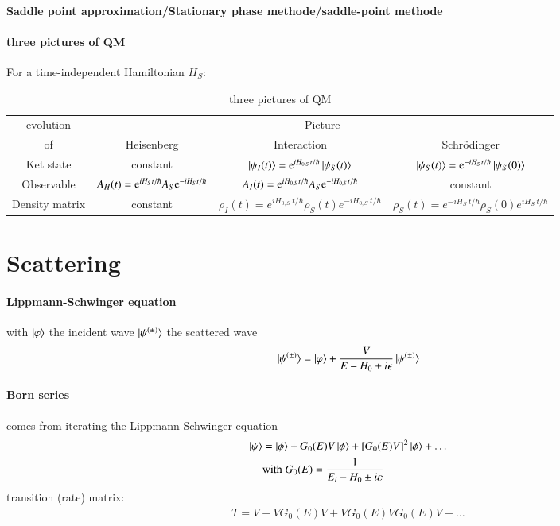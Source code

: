 \paragraph{Saddle point approximation/Stationary phase methode/saddle-point methode}
\paragraph{three pictures of QM}
For a time-independent Hamiltonian $H_S$:
\begin{table}[H]
	\centering
	\begin{tabular}{cccc}
		\toprule
		evolution & \multicolumn{3}{c}{Picture} \\
		of & Heisenberg & Interaction & Schrödinger \\
		\midrule
		Ket state & constant & $\ket{\psi_I(t)}=\mathrm{e}^{iH_{0,S}t/\hbar}\ket{\psi_S (t)}$ & $\ket{\psi_S(t)}=\mathrm{e}^{-iH_St/\hbar}\ket{\psi_S(0)}$ \\
		Observable & $A_H(t) = \mathrm{e}^{iH_S t/ \hbar}A_S \mathrm{e}^{-iH_S t / \hbar}$ & $ A_I(t) = \mathrm{e}^{iH_{0,S}t/\hbar}A_S\mathrm{e}^{-iH_{0,S}t/\hbar}$ & constant \\
		Density matrix & constant & $\rho_I (t)=e^{i H_{0, S} ~t / \hbar}  \rho_S (t) e^{-i H_{0, S}~ t / \hbar}$ & $\rho_S (t)=  e^{-i H_{ S} ~t / \hbar} \rho_S(0) e^{i H_{ S}~ t / \hbar}$ \\
		\bottomrule
	\end{tabular}
	\caption{three pictures of QM}
\end{table}
\section{Scattering}
\paragraph{Lippmann-Schwinger equation} with $\ket{\varphi}$ the incident wave $\ket{\psi^{(\pm)}}$ the scattered wave
\begin{equation}
	\ket{\psi^{(\pm)}}  = \ket{\varphi} + \frac{V}{E-H_0 \pm i \epsilon}\ket{\psi^{(\pm)}}
\end{equation}

\paragraph{Born series}
comes from iterating the Lippmann-Schwinger equation
\begin{align}
	\begin{split}
	\ket{\psi} &= \ket{\phi} + G_0(E)V\ket{\phi} + [G_0(E)V]^2\ket{\phi} + \dots \\
			   &\text{with} \; G_0(E) = \frac{1}{E_i - H_0 \pm i\varepsilon}
	\end{split}
\end{align}
transition (rate) matrix:
\begin{align}
	T = V + VG_0(E)V + VG_0(E)VG_0(E)V + \dots	
\end{align}
